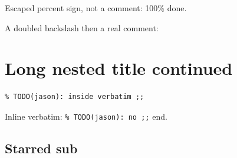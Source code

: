 \documentclass{article}
\begin{document}

Escaped percent sign, not a comment: 100\% done.

A doubled backslash then a real comment: \\%

\section[Short {v}]{Long \textbf{nested} title %
continued}

\begin{verbatim}
% TODO(jason): inside verbatim ;;
\end{verbatim}

Inline verbatim: \verb|% TODO(jason): no ;;| end.

\subsection*{Starred sub}

\end{document}
